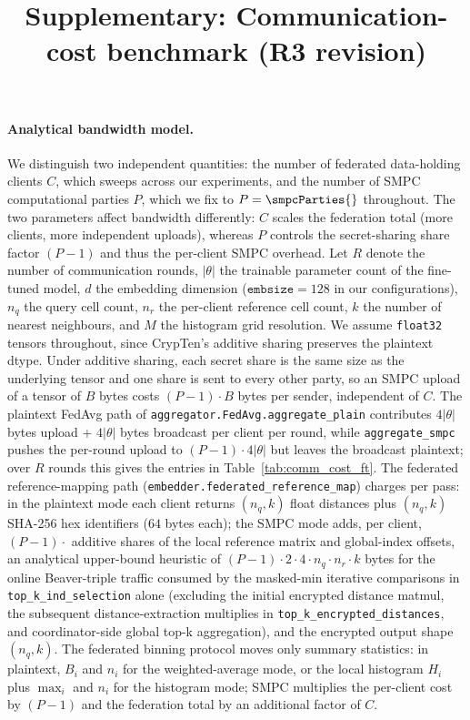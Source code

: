 \documentclass{article}
\title{Supplementary: Communication-cost benchmark (R3 revision)}
\date{}
\begin{document}
\maketitle



\paragraph{Analytical bandwidth model.} We distinguish two independent
quantities: the number of federated data-holding clients $C$, which
sweeps across our experiments, and the number of SMPC computational
parties $P$, which we fix to $P=\smpcParties{}$ throughout. The two
parameters affect bandwidth differently: $C$ scales the federation
total (more clients, more independent uploads), whereas $P$ controls
the secret-sharing share factor $(P-1)$ and thus the per-client SMPC
overhead. Let $R$ denote the number of communication rounds,
$|\theta|$ the trainable parameter count of the fine-tuned model, $d$
the embedding dimension ($\texttt{embsize}=128$ in our configurations),
$n_q$ the query cell count, $n_r$ the per-client reference cell count,
$k$ the number of nearest neighbours, and $M$ the histogram grid
resolution. We assume \texttt{float32} tensors throughout, since
CrypTen's additive sharing preserves the plaintext dtype. Under
additive sharing, each secret share is the same size as the underlying
tensor and one share is sent to every other party, so an SMPC upload
of a tensor of $B$ bytes costs $(P-1)\cdot B$ bytes per sender,
independent of $C$. The plaintext FedAvg path of
\texttt{aggregator.FedAvg.aggregate\_plain} contributes $4|\theta|$
bytes upload + $4|\theta|$ bytes broadcast per client per round, while
\texttt{aggregate\_smpc} pushes the per-round upload to
$(P-1)\cdot 4|\theta|$ but leaves the broadcast plaintext; over $R$
rounds this gives the entries in Table~\ref{tab:comm_cost_ft}. The
federated reference-mapping path
(\texttt{embedder.federated\_reference\_map}) charges per pass: in the
plaintext mode each client returns $(n_q,k)$ float distances plus
$(n_q,k)$ SHA-256 hex identifiers ($64$ bytes each); the SMPC mode
adds, per client, $(P-1)\cdot$ additive shares of the local reference
matrix and global-index offsets, an analytical upper-bound heuristic
of $(P-1)\cdot 2\cdot 4\cdot n_q\cdot n_r\cdot k$ bytes for the online
Beaver-triple traffic consumed by the masked-min iterative comparisons
in \texttt{top\_k\_ind\_selection} alone (excluding the initial
encrypted distance matmul, the subsequent distance-extraction
multiplies in \texttt{top\_k\_encrypted\_distances}, and
coordinator-side global top-k aggregation), and the encrypted output
shape $(n_q,k)$. The federated binning protocol moves only summary
statistics: in plaintext, $B_i$ and $n_i$ for the weighted-average
mode, or the local histogram $H_i$ plus $\max_i$ and $n_i$ for the
histogram mode; SMPC multiplies the per-client cost by $(P-1)$ and the
federation total by an additional factor of $C$.
\end{document}
